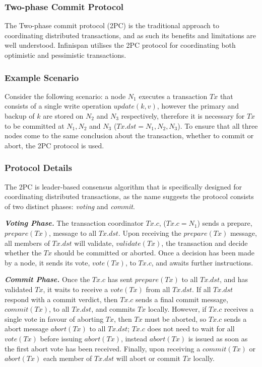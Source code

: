         
	    \subsubsection{Two-phase Commit Protocol}
	       The Two-phase commit protocol (2PC)\citep{Bernstein:1996:PTP:261193} is the traditional approach to coordinating distributed transactions, and as such its benefits and limitations are well understood.  Infinispan utilises the 2PC protocol for coordinating both optimistic and pessimistic transactions.  
	       
           \subsubsection*{Example Scenario} \label{transaction_scenario} 
           Consider the following scenario: a node $N_1$ executes a transaction $Tx$ that consists of a single write operation $update(k, v)$, however the primary and backup of $k$ are stored on $N_2$ and $N_3$ respectively, therefore it is necessary for $Tx$ to be committed at $N_1, N_2$ and $N_3$ ($Tx.dst = N_1, N_2, N_3$).  To ensure that all three nodes come to the same conclusion about the transaction, whether to commit or abort, the 2PC protocol is used.  
	       
	       \subsubsection*{Protocol Details}
	       The 2PC is leader-based consensus algorithm that is specifically designed for coordinating distributed transactions, as the name suggests the protocol consists of two distinct phases: \emph{voting} and \emph{commit}. 
	       
	       \textbf{\emph{Voting Phase.}} The transaction coordinator $Tx.c$, ($Tx.c = N_1$) sends a prepare, $prepare(Tx)$, message to all $Tx.dst$.  Upon receiving the $prepare(Tx)$ message, all members of $Tx.dst$ will validate, $validate(Tx)$, the transaction and decide whether the $Tx$ should be committed or aborted.  Once a decision has been made by a node, it sends its vote, $vote(Tx)$, to $Tx.c$, and awaits further instructions.  
	       
	       \textbf{\emph{Commit Phase.}}  Once the $Tx.c$ has sent $prepare(Tx)$ to all $Tx.dst$, and has validated $Tx$, it waits to receive a $vote(Tx)$ from all $Tx.dst$.  If all $Tx.dst$ respond with a commit verdict, then $Tx.c$ sends a final commit message, $commit(Tx)$, to all $Tx.dst$, and commits $Tx$ locally.  However, if $Tx.c$ receives a single vote in favour of aborting $Tx$, then $Tx$ must be aborted, so $Tx.c$ sends a abort message $abort(Tx)$ to all $Tx.dst$; $Tx.c$ does not need to wait for all $vote(Tx)$ before issuing $abort(Tx)$, instead $abort(Tx)$ is issued as soon as the first abort vote has been received.  Finally, upon receiving a $commit(Tx)$ or $abort(Tx)$ each member of $Tx.dst$ will abort or commit $Tx$ locally.  
	       
